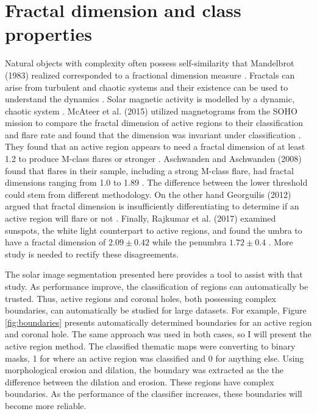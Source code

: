 \documentclass[twoside]{report}
\begin{document}
\section{Fractal dimension and class properties} \label{sec:fractal}
Natural objects with complexity often possess self-similarity that Mandelbrot (1983) realized corresponded to a fractional dimension measure \cite{mandelbrot}. Fractals can arise from turbulent and chaotic systems and their existence can be used to understand the dynamics \cite{fractalchaos}. Solar magnetic activity is modelled by a dynamic, chaotic system \cite{lawrence+1995}. McAteer et al. (2015) utilized magnetograms from the SOHO mission to compare the fractal dimension of active regions to their classification and flare rate and found that the dimension was invariant under classification \cite{mcateer+2005}. They found that an active region appears to need a fractal dimension of at least 1.2 to produce M-class flares or stronger \cite{mcateer+2005}.  Aschwanden and Aschwanden (2008) found that flares in their sample, including a strong M-class flare, had fractal dimensions ranging from 1.0 to 1.89 \cite{aschwandensquared}. The difference between the lower threshold could stem from different methodology. On the other hand Georguilis (2012) argued that fractal dimension is insufficiently differentiating to determine if an active region will flare or not \cite{Georgoulis2012}. Finally, Rajkumar et al. (2017) examined sunspots, the white light counterpart to active regions, and found the umbra to have a fractal dimension of $2.09 \pm 0.42$ while the penumbra $1.72 \pm 0.4$ \cite{Rajkumar2017}. More study is needed to rectify these disagreements. 

The solar image segmentation presented here provides a tool to assist with that study. As performance improve, the classification of regions can automatically be trusted. Thus, active regions and coronal holes, both possessing complex boundaries, can automatically be studied for large datasets. For example, Figure \ref{fig:boundaries} presents automatically determined boundaries for an active region and coronal hole. The same approach was used in both cases, so I will present the active region method. The classified thematic maps were converting to binary masks, 1 for where an active region was classified and 0 for anything else. Using morphological erosion and dilation, the boundary was extracted as the the difference between the dilation and erosion. These regions have complex boundaries. As the performance of the classifier increases, these boundaries will become more reliable. 
\end{document}
